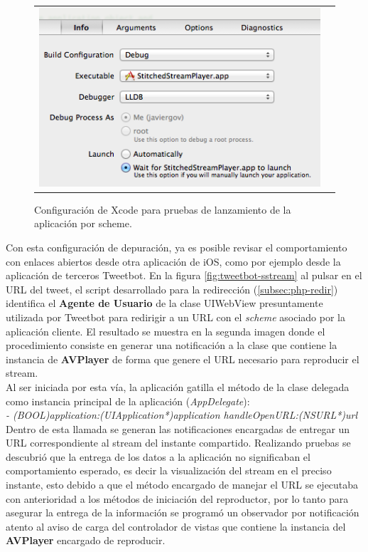 \begin{figure}[H]
	\centering
	\begin{tabular}{cc}
	\includegraphics[scale=0.7]{imgs/xcode-debug-wait.png}
	\end{tabular}
	\caption{Configuración de Xcode para pruebas de lanzamiento de la aplicación por scheme.}
	\label{fig:xcode-debug-wait}
\end{figure}

Con esta configuración de depuración, ya es posible revisar el comportamiento con enlaces abiertos desde otra aplicación de iOS, como por ejemplo desde la aplicación de terceros Tweetbot. En la figura \ref{fig:tweetbot-sstream} al pulsar en el URL del tweet, el script desarrollado para la redirección (\ref{subsec:php-redir}) identifica el \textbf{Agente de Usuario} de la clase UIWebView presuntamente utilizada por Tweetbot para redirigir a un URL con el \textit{scheme} asociado por la aplicación cliente. El resultado se muestra en la segunda imagen donde el procedimiento consiste en generar una notificación a la clase que contiene la instancia de \textbf{AVPlayer} de forma que genere el URL necesario para reproducir el stream.\\

Al ser iniciada por esta vía, la aplicación gatilla el método de la clase delegada como instancia principal de la aplicación (\textit{AppDelegate}):\\

\textit{- (BOOL)application:(UIApplication*)application handleOpenURL:(NSURL*)url}\\

Dentro de esta llamada se generan las notificaciones encargadas de entregar un URL correspondiente al stream del instante compartido. Realizando pruebas se descubrió que la entrega de los datos a la aplicación no significaban el comportamiento esperado, es decir la visualización del stream en el preciso instante, esto debido a que el método encargado de manejar el URL se ejecutaba con anterioridad a los métodos de iniciación del reproductor, por lo tanto para asegurar la entrega de la información se programó un observador por notificación \cite{bib:ios-nsnotificationcenter} atento al aviso de carga del controlador de vistas que contiene la instancia del \textbf{AVPlayer} encargado de reproducir. \\

